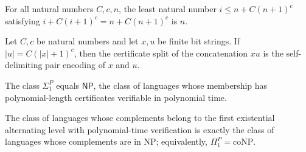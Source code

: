 \begin{theorem}
\label{Complexity.solveSplit_self}
\leanok
{}
For all natural numbers $C,c,n$, the least natural number $i\le n+C(n+1)^c$ satisfying
$i+C(i+1)^c=n+C(n+1)^c$ is $n$.
\end{theorem}

\begin{theorem}
\label{Complexity.certSplit_append}
\leanok
{}
Let $C,c$ be natural numbers and let $x,u$ be finite bit strings. If $|u|=C(|x|+1)^c$,
then the certificate split of the concatenation $xu$ is the self-delimiting pair
encoding of $x$ and $u$.
\end{theorem}

\begin{theorem}
\label{Complexity.SigmaP_one}
\leanok
{}
The class $\Sigma_1^P$ equals $\mathsf{NP}$, the class of languages whose membership has
polynomial-length certificates verifiable in polynomial time.
\end{theorem}

\begin{theorem}
\label{Complexity.PiP_one}
\leanok
{}
The class of languages whose complements belong to the first existential alternating
level with polynomial-time verification is exactly the class of languages whose
complements are in $\mathrm{NP}$; equivalently, $\Pi_1^P=\mathrm{coNP}$.
\end{theorem}

